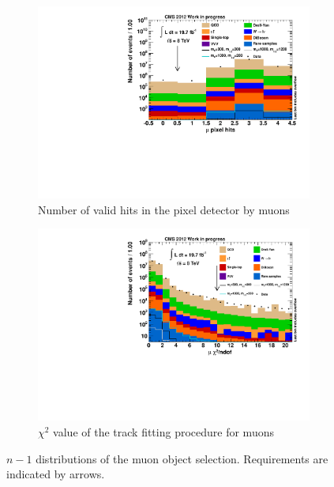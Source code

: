 \begin{figure}[!htb]
  \ContinuedFloat
  \centering
  \begin{subfigure}[b]{0.495\textwidth}
    \centering
    \includegraphics[width=\textwidth]{plots/nMuon_ValidPixelHitsCm.pdf}
    \caption{Number of valid hits in the pixel detector by muons\label{fig:muo_validpixelhits}}
  \end{subfigure}
  \begin{subfigure}[b]{0.495\textwidth}
    \centering
    \includegraphics[width=\textwidth]{plots/nMuon_TrkChi.pdf}
    \caption{$\chi^2$ value of the track fitting procedure for muons\label{fig:muo_chi2}}
  \end{subfigure}

  \caption{$n - 1$ distributions of the muon object selection. Requirements are indicated by arrows.}
  \label{fig:n-1}
\end{figure}


